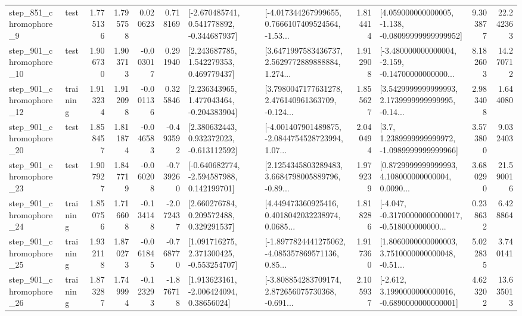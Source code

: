 \begin{tabular}{llrrrrllrlrr}
   step\_851\_chromophore\_9 &      test &      1.775136 &    1.795758 &      0.020623 &  0.718169 &   [-2.670485741, 0.541778892, -0.344687937] &  [-4.017344267999655, 0.7666107409524564, -1.53... &       1.814414 &  [4.059000000000005, -1.138, -0.08099999999999952] &            9.303877 &         22.242363 \\
  step\_901\_chromophore\_10 &      test &      1.906730 &    1.903713 &     -0.003017 &  0.291940 &     [2.243687785, 1.542279353, 0.469779437] &  [3.6471997583436737, 2.5629772889888884, 1.274... &       1.912908 &  [-3.480000000000004, -2.159, -0.14700000000000... &            8.182603 &         14.270712 \\
  step\_901\_chromophore\_12 &  training &      1.913234 &    1.912098 &     -0.001136 &  0.325846 &    [2.236343965, 1.477043464, -0.204383904] &  [3.7980047177631278, 2.476140961363709, -0.124... &       1.855627 &  [3.5429999999999993, 2.1739999999999995, -0.14... &            2.983408 &          1.644080 \\
  step\_901\_chromophore\_20 &      test &      1.858457 &    1.811874 &     -0.046583 & -0.493592 &    [2.380632443, 0.932372023, -0.613112592] &  [-4.001407901489875, -2.0844754528723994, 1.07... &       2.040494 &     [3.7, 1.2389999999999972, -1.0989999999999966] &            3.573800 &          9.032403 \\
  step\_901\_chromophore\_23 &      test &      1.907927 &    1.847719 &     -0.060208 & -0.739260 &   [-0.640682774, -2.594587988, 0.142199701] &  [2.1254345803289483, 3.6684798005889796, -0.89... &       1.979239 &  [0.8729999999999993, 4.108000000000004, 0.0090... &            3.680290 &         21.590016 \\
  step\_901\_chromophore\_24 &  training &      1.850756 &    1.716608 &     -0.134148 & -2.072437 &     [2.660276784, 0.209572488, 0.329291537] &  [4.449473360925416, 0.4018042032238974, 0.0685... &       1.818286 &  [-4.047, -0.31700000000000017, -0.518000000000... &            0.238632 &          6.428864 \\
  step\_901\_chromophore\_25 &  training &      1.932118 &    1.870273 &     -0.061845 & -0.768770 &    [1.091716275, 2.371300425, -0.553254707] &  [-1.8977824441275062, -4.085357869571136, 0.85... &       1.917360 &  [1.8060000000000003, 3.7510000000000048, -0.51... &            5.022835 &          3.740141 \\
  step\_901\_chromophore\_26 &  training &      1.873287 &    1.749994 &     -0.123293 & -1.876718 &     [1.913623161, -2.006424094, 0.38656024] &  [-3.808854283709174, 2.872656075730368, -0.691... &       2.105937 &  [-2.612, 3.1990000000000016, -0.6890000000000001] &            4.623202 &         13.635013 \\

\end{tabular}
